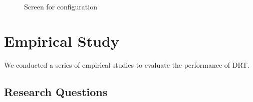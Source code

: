 \documentclass[10pt,journal,compsoc]{IEEEtran}
\begin{document}
\begin{figure}
  \centering
  \caption{Screen for configuration}
  \label{fig:configuration}
\end{figure}


\section{Empirical Study}
\label{sec:empiricalstudy}

We conducted a series of empirical studies to evaluate the performance of DRT.

\subsection{Research Questions}
\label{sec:questions}
\end{document}
